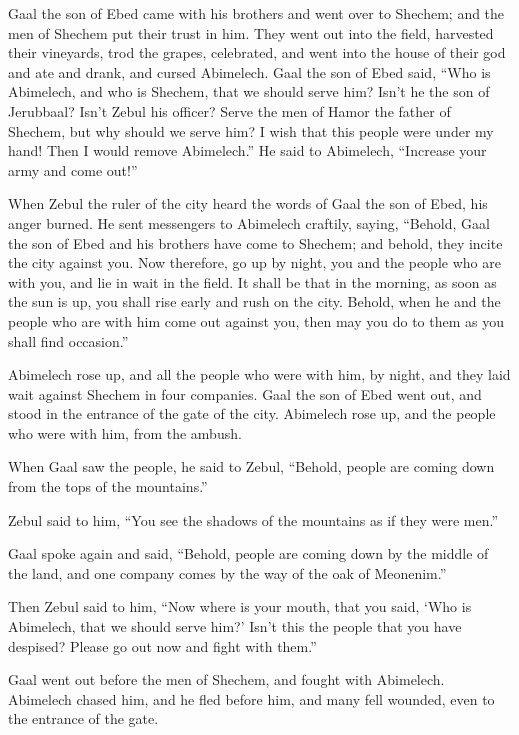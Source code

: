 {\par }{\PP {}Gaal the son of Ebed came with his brothers and went over to Shechem; and the men of Shechem put their trust in him.
They went out into the field, harvested their vineyards, trod the grapes, celebrated, and went into the house of their god and ate and drank, and cursed Abimelech.
Gaal the son of Ebed said, “Who is Abimelech, and who is Shechem, that we should serve him? Isn’t he the son of Jerubbaal? Isn’t Zebul his officer? Serve the men of Hamor the father of Shechem, but why should we serve him?
I wish that this people were under my hand! Then I would remove Abimelech.” He said to Abimelech, “Increase your army and come out!”
\par }{\PP {}When Zebul the ruler of the city heard the words of Gaal the son of Ebed, his anger burned.
He sent messengers to Abimelech craftily, saying, “Behold, Gaal the son of Ebed and his brothers have come to Shechem; and behold, they incite the city against you.
Now therefore, go up by night, you and the people who are with you, and lie in wait in the field.
It shall be that in the morning, as soon as the sun is up, you shall rise early and rush on the city. Behold, when he and the people who are with him come out against you, then may you do to them as you shall find occasion.”
\par }{\PP {}Abimelech rose up, and all the people who were with him, by night, and they laid wait against Shechem in four companies.
Gaal the son of Ebed went out, and stood in the entrance of the gate of the city. Abimelech rose up, and the people who were with him, from the ambush.
\par }{\PP {}When Gaal saw the people, he said to Zebul, “Behold, people are coming down from the tops of the mountains.”
\par }{\PP Zebul said to him, “You see the shadows of the mountains as if they were men.”
\par }{\PP {}Gaal spoke again and said, “Behold, people are coming down by the middle of the land, and one company comes by the way of the oak of Meonenim.”
\par }{\PP {}Then Zebul said to him, “Now where is your mouth, that you said, ‘Who is Abimelech, that we should serve him?’ Isn’t this the people that you have despised? Please go out now and fight with them.”
\par }{\PP {}Gaal went out before the men of Shechem, and fought with Abimelech.
Abimelech chased him, and he fled before him, and many fell wounded, even to the entrance of the gate.
}

